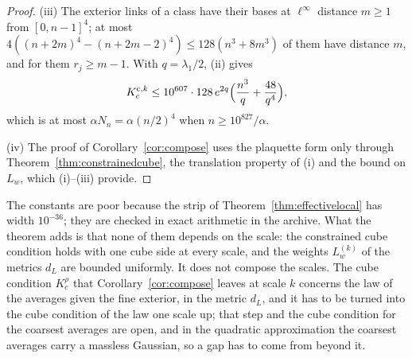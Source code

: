 \documentclass[11pt]{amsart}
\theoremstyle{definition}
\theoremstyle{remark}
\numberwithin{equation}{section}
\begin{document}
\begin{proof}
(iii) The exterior links of a class have their bases at $\ell^\infty$ distance
$m\ge1$ from $[0,n-1]^4$; at most $4((n+2m)^4-(n+2m-2)^4)\le128(n^3+8m^3)$
of them have distance $m$, and for them $r_j\ge m-1$. With
$q=\lambda_1/2$, (ii) gives
\[
K^{{\rm c},k}_c\le10^{607}\cdot128\,e^{2q}\Bigl(\frac{n^3}q+\frac{48}{q^4}
\Bigr),
\]
which is at most $\alpha N_n=\alpha(n/2)^4$ when $n\ge10^{827}/\alpha$.

(iv) The proof of Corollary~\ref{cor:compose} uses the plaquette form only
through Theorem~\ref{thm:constrainedcube}, the translation property of (i)
and the bound on $L_w$, which (i)--(iii) provide.
\end{proof}

The constants are poor because the strip of Theorem~\ref{thm:effectivelocal}
has width $10^{-36}$; they are checked in exact arithmetic in the archive.
What the theorem adds is that none of them depends on the scale: the
constrained cube condition holds with one cube side at every scale, and the
weights $L^{(k)}_w$ of the metrics $d_L$ are bounded uniformly. It does not
compose the scales. The cube condition $K^\rho_c$ that
Corollary~\ref{cor:compose} leaves at scale $k$ concerns the law of the
averages given the fine exterior, in the metric $d_L$, and it has to be turned
into the cube condition of the law one scale up; that step and the cube
condition for the coarsest averages are open, and in the quadratic
approximation the coarsest averages carry a massless Gaussian, so a gap has
to come from beyond it.
\end{document}
